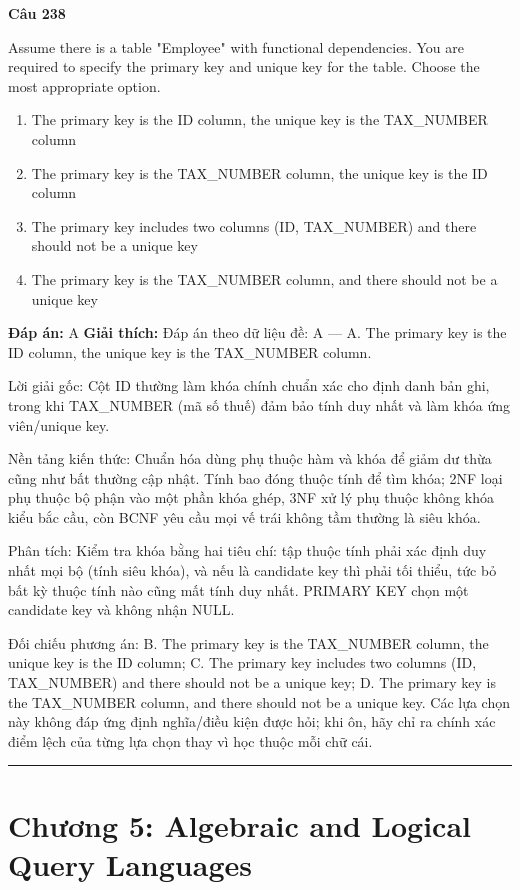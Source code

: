 \documentclass[11pt,a4paper]{article}
\newenvironment{question}[1]{%
  \par\vspace{1em}\noindent\textbf{\large Câu #1}\par\vspace{0.4em}
}{%
  \par\vspace{1em}\hrule\vspace{0.6em}
}
\newenvironment{choices}{%
  \begin{enumerate}[label=\textbf{\Alph*.},leftmargin=2.2em,itemsep=2pt,topsep=3pt]
}{%
  \end{enumerate}
}
\newcommand{\choice}{\item}
\begin{document}
\begin{question}{238}
Assume there is a table "Employee" with functional dependencies. You are required to specify the primary key and unique key for the table. Choose the most appropriate option.
\begin{choices}
\choice The primary key is the ID column, the unique key is the TAX_NUMBER column
\choice The primary key is the TAX_NUMBER column, the unique key is the ID column
\choice The primary key includes two columns (ID, TAX_NUMBER) and there should not be a unique key
\choice The primary key is the TAX_NUMBER column, and there should not be a unique key
\end{choices}
\textbf{Đáp án:} A
\textbf{Giải thích:} Đáp án theo dữ liệu đề: A — A. The primary key is the ID column, the unique key is the TAX_NUMBER column.

Lời giải gốc: Cột ID thường làm khóa chính chuẩn xác cho định danh bản ghi, trong khi TAX_NUMBER (mã số thuế) đảm bảo tính duy nhất và làm khóa ứng viên/unique key.

Nền tảng kiến thức: Chuẩn hóa dùng phụ thuộc hàm và khóa để giảm dư thừa cũng như bất thường cập nhật. Tính bao đóng thuộc tính để tìm khóa; 2NF loại phụ thuộc bộ phận vào một phần khóa ghép, 3NF xử lý phụ thuộc không khóa kiểu bắc cầu, còn BCNF yêu cầu mọi vế trái không tầm thường là siêu khóa.

Phân tích: Kiểm tra khóa bằng hai tiêu chí: tập thuộc tính phải xác định duy nhất mọi bộ (tính siêu khóa), và nếu là candidate key thì phải tối thiểu, tức bỏ bất kỳ thuộc tính nào cũng mất tính duy nhất. PRIMARY KEY chọn một candidate key và không nhận NULL.

Đối chiếu phương án: B. The primary key is the TAX_NUMBER column, the unique key is the ID column; C. The primary key includes two columns (ID, TAX_NUMBER) and there should not be a unique key; D. The primary key is the TAX_NUMBER column, and there should not be a unique key. Các lựa chọn này không đáp ứng định nghĩa/điều kiện được hỏi; khi ôn, hãy chỉ ra chính xác điểm lệch của từng lựa chọn thay vì học thuộc mỗi chữ cái.
\end{question}


\newpage
\section*{Chương 5: Algebraic and Logical Query Languages}
\end{document}
